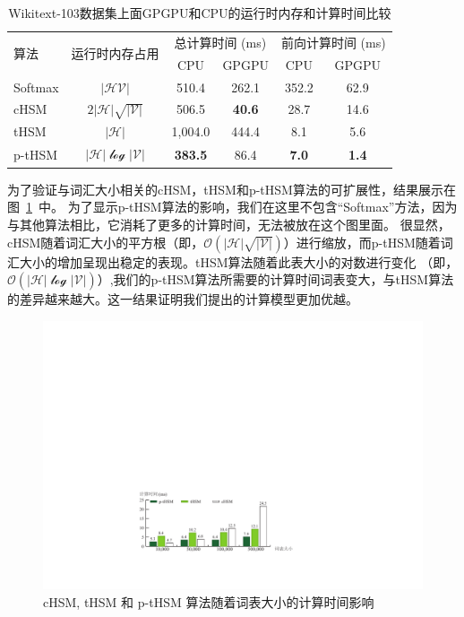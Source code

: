\begin{table}[!ht]
  \centering
  \caption{Wikitext-103数据集上面GPGPU和CPU的运行时内存和计算时间比较\label{tab:time}}
\begin{tabular}{lccccc}
  \toprule
 \multirow{2}{*}{算法}  &\multirow{2}{*}{运行时内存占用} &\multicolumn{2}{c}{总计算时间 (ms)} & \multicolumn{2}{c}{前向计算时间 (ms)}   \\
   \cmidrule(lr){3-4}  \cmidrule(lr){5-6}
	& & CPU&GPGPU & CPU& GPGPU \\ \midrule
Softmax & $\mathcal{|HV|}$ &510.4  &262.1&352.2& 62.9 \\
cHSM    & $2\mathcal{|H|\sqrt{|V|}}$&506.5  &\textbf{40.6}&28.7&14.6 \\
tHSM    &$\mathcal{|H|}$&1,004.0 &444.4 & 8.1&  5.6   \\
p-tHSM  &$\mathcal{|H|\log{|V|}}$ &\textbf{383.5}&	86.4 &\textbf{7.0}&	\textbf{1.4} \\
  \bottomrule
\end{tabular}
\end{table}



为了验证与词汇大小相关的cHSM，tHSM和p-tHSM算法的可扩展性，结果展示在图~\ref{fig:hsm_benchmark}~中。 为了显示p-tHSM算法的影响，我们在这里不包含“Softmax”方法，因为与其他算法相比，它消耗了更多的计算时间，无法被放在这个图里面。 很显然，cHSM随着词汇大小的平方根（即，$ \mathcal{O(| H | \sqrt{| V |})} $）进行缩放，而p-tHSM随着词汇大小的增加呈现出稳定的表现。tHSM算法随着此表大小的对数进行变化 （即，$ \mathcal{O(| H | \log{| V |})} $）,我们的p-tHSM算法所需要的计算时间词表变大，与tHSM算法的差异越来越大。这一结果证明我们提出的计算模型更加优越。
\begin{figure}[!ht]
  \centering
  \includegraphics[width=.87\columnwidth]{./figures/all_time.pdf}
  \caption{cHSM, tHSM 和 p-tHSM 算法随着词表大小的计算时间影响}\label{fig:hsm_benchmark}
\end{figure}

